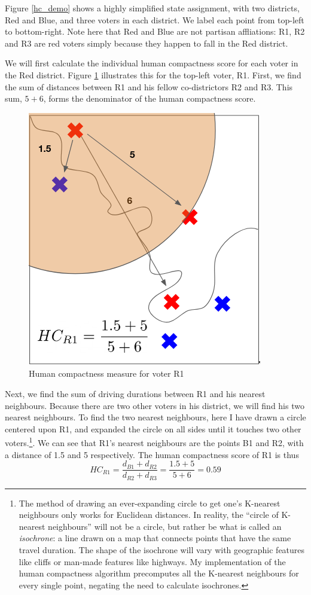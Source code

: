 \documentclass[]{article}
\begin{document}
Figure \ref{hc_demo} shows a highly simplified state assignment, with
two districts, Red and Blue, and three voters in each district. We label
each point from top-left to bottom-right. Note here that Red and Blue
are not partisan affliations: R1, R2 and R3 are red voters simply
because they happen to fall in the Red district.

We will first calculate the individual human compactness score for each
voter in the Red district. Figure \ref{hc_r1} illustrates this for the
top-left voter, R1. First, we find the sum of distances between R1 and
his fellow co-districtors R2 and R3. This sum, \(5 + 6\), forms the
denominator of the human compactness score.

\begin{figure}
\centering
\includegraphics{img/human_compactness_2a.png}
\caption{Human compactness measure for voter R1 \label{hc_r1}}
\end{figure}

Next, we find the sum of driving durations between R1 and his nearest
neighbours. Because there are two other voters in his district, we will
find his two nearest neighbours. To find the two nearest neighbours,
here I have drawn a circle centered upon R1, and expanded the circle on
all sides until it touches two other voters.\footnote{The method of
  drawing an ever-expanding circle to get one's K-nearest neighbours
  only works for Euclidean distances. In reality, the ``circle of
  K-nearest neighbours'' will not be a circle, but rather be what is
  called an \emph{isochrone}: a line drawn on a map that connects points
  that have the same travel duration. The shape of the isochrone will
  vary with geographic features like cliffs or man-made features like
  highways. My implementation of the human compactness algorithm
  precomputes all the K-nearest neighbours for every single point,
  negating the need to calculate isochrones.}. We can see that R1's
nearest neighbours are the points B1 and R2, with a distance of 1.5 and
5 respectively. The human compactness score of R1 is thus
\[HC_{R1} = \frac{d_{B1}+d_{R2}}{d_{R2} +
d_{R3}} = \frac{1.5 + 5}{5+6} = 0.59\]
\end{document}
